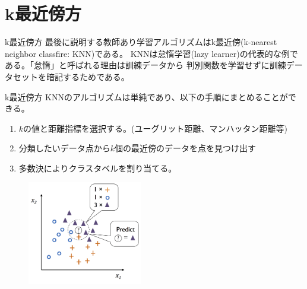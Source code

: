\documentclass[aspectratio=169, dvipdfmx, 11pt]{beamer} %
\begin{document}
\section{k最近傍方}
\begin{frame}{k最近傍方}
    最後に説明する教師あり学習アルゴリズムはk最近傍(k-nearest neighbor classfire: KNN)である。
    KNNは怠惰学習(lazy learner)の代表的な例である。「怠惰」と呼ばれる理由は訓練データから
    判別関数を学習せずに訓練データセットを暗記するためである。
\end{frame}

\begin{frame}{k最近傍方}
    KNNのアルゴリズムは単純であり、以下の手順にまとめることができる。
    \vspace{1em}
    \begin{enumerate}
        \item \(k\)の値と距離指標を選択する。(ユーグリット距離、マンハッタン距離等)
        \item 分類したいデータ点から\(k\)個の最近傍のデータを点を見つけ出す
        \item 多数決によりクラスタベルを割り当てる。
    \end{enumerate}
    \begin{figure}[b]
        \begin{center}
        \includegraphics[width=50mm]{img/day03/fig04.png}
        \end{center}
    \end{figure}
\end{frame}
\end{document}
